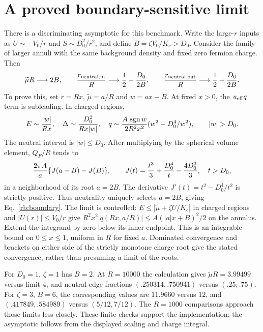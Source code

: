 \documentclass[11pt]{article}
\begin{document}
\section{A proved boundary-sensitive limit}
There is a discriminating asymptotic for this benchmark. Write the large-$r$
inputs as $U\sim-V_0/r$ and $S\sim D_0^2/r^2$, and define
$B=\zeta V_0/K_c>D_0$. Consider the family of larger annuli with the
same background density and fixed zero fermion charge. Then
\begin{equation}
 \widetilde\mu R\longrightarrow2B,\qquad
 {r_{\rm neutral,in}\over R}\longrightarrow{1\over2}-{D_0\over2B},
 \qquad
 {r_{\rm neutral,out}\over R}\longrightarrow{1\over2}+{D_0\over2B}.
 \label{rb:boundary}
\end{equation}
To prove this, set $r=Rx$, $\widetilde\mu=a/R$ and $w=ax-B$.
At fixed $x>0$, the $u_{\rm eff}q$ term is subleading. In charged regions,
\begin{equation}
 E\sim{|w|\over Rx},\quad
 \Delta\sim{D_0^2\over Rx|w|},\quad
 q\sim{A\,\operatorname{sgn}w\over2R^2x^2}
          (w^2-D_0^4/w^2),\qquad |w|>D_0.
\end{equation}
The neutral interval is $|w|\leq D_0$. After multiplying by the spherical
volume element, $Q_F/R$ tends to
\begin{equation}
 {2\pi A\over a}\{J(a-B)-J(B)\},\qquad
 J(t)={t^3\over3}+{D_0^4\over t}-{4D_0^3\over3},\quad t>D_0,
\end{equation}
in a neighborhood of its root $a=2B$.
The derivative $J'(t)=t^2-D_0^4/t^2$ is strictly positive.
Thus neutrality uniquely selects $a=2B$, giving Eq.~\eqref{rb:boundary}.
The limit is controlled: $E\leq|\widetilde\mu+\zeta U/K_c|$ in
charged regions and $|U(r)|\leq V_0/r$ give
$R^2x^2|q(Rx,a/R)|\leq A(|a|x+B)^2/2$ on the annulus.
Extend the integrand by zero below its inner endpoint. This is an
integrable bound on $0\leq x\leq1$, uniform in $R$ for fixed $a$.
Dominated convergence and brackets on either side of
the strictly monotone charge root give the stated convergence, rather
than presuming a limit of the roots.

For $D_0=1$, $\zeta=1$ has $B=2$. At $R=10000$ the calculation gives
$\widetilde\mu R=3.99499$ versus limit $4$, and neutral edge fractions
$(.250314,.750941)$ versus $(.25,.75)$. For $\zeta=3$, $B=6$,
the corresponding values are $11.9660$ versus $12$, and
$(.417849,.584989)$ versus $(5/12,7/12)$.
The $R=1000$ comparisons approach those limits less closely. These
finite checks support the implementation; the asymptotic follows from the
displayed scaling and charge integral.
\end{document}
